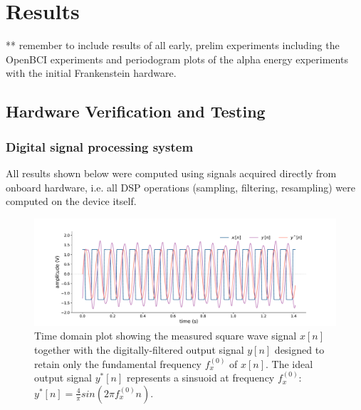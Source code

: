 \chapter{Results}
\label{chapter:results}

\graphicspath{ {report/C6 Results/assets/} } 

** remember to include results of all early, prelim experiments including the OpenBCI experiments and periodogram plots of the alpha energy experiments with the initial Frankenstein hardware.

\section{Hardware Verification and Testing}
\subsection{Digital signal processing system}

All results shown below were computed using signals acquired directly from onboard hardware, i.e. all DSP operations (sampling, filtering, resampling) were computed on the device itself.

\begin{figure}[h]
    \centering
    \includegraphics[width=\textwidth]{sq_wave_filtering_time}
    \caption[Time domain plot showing the measured square wave signal together with the digitally-filtered output signal.]{Time domain plot showing the measured square wave signal $x[n]$ together with the digitally-filtered output signal $y[n]$ designed to retain only the fundamental frequency $f_x^{(0)}$ of $x[n]$. The ideal output signal $y^*[n]$ represents a sinsuoid at frequency $f_x^{(0)}$: $y^*[n] = \frac{4}{\pi}sin(2\pi f_x^{(0)}n)$.}
    \label{fig:sq-wave-time-c6}
\end{figure}

